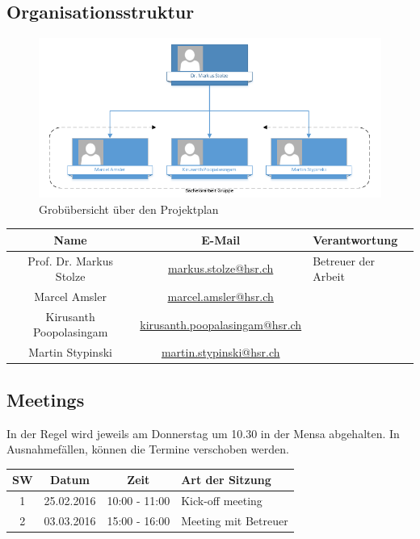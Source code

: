 \subsection{Organisationsstruktur}
\begin{figure}[ht]
	\centering
	\includegraphics[width=\textwidth]{images/organigram.png}
	\caption{Grobübersicht über den Projektplan}
	\label{Risk result}
\end{figure}
\noindent
\begin{tabularx}{\textwidth}{|c|c|X|}
  \hline
  \textbf{Name} & \textbf{E-Mail} & \textbf{Verantwortung} \\
  \hline \hline
  Prof. Dr. Markus Stolze & \url{markus.stolze@hsr.ch} & Betreuer der Arbeit\\
  \hline \hline
  Marcel Amsler & \url{marcel.amsler@hsr.ch} & \\
  \hline
  Kirusanth Poopolasingam & \url{kirusanth.poopalasingam@hsr.ch} & \\
  \hline
  Martin Stypinski & \url{martin.stypinski@hsr.ch} & \\
  \hline
\end{tabularx}
\subsection{Meetings}
In der Regel wird jeweils am Donnerstag um 10.30 in der Mensa abgehalten. In Ausnahmefällen, können die Termine verschoben werden.
  \\[1\normalbaselineskip]
\begin{tabularx}{\textwidth}{|c|c|c|X|}
  \hline
  \textbf{SW} & \textbf{Datum} & \textbf{Zeit} & \textbf{Art der Sitzung} \\
  \hline \hline
  1 & 25.02.2016 & 10:00 - 11:00 &  Kick-off meeting \\
  2 & 03.03.2016 & 15:00 - 16:00 &  Meeting mit Betreuer \\
  \hline
\end{tabularx}

